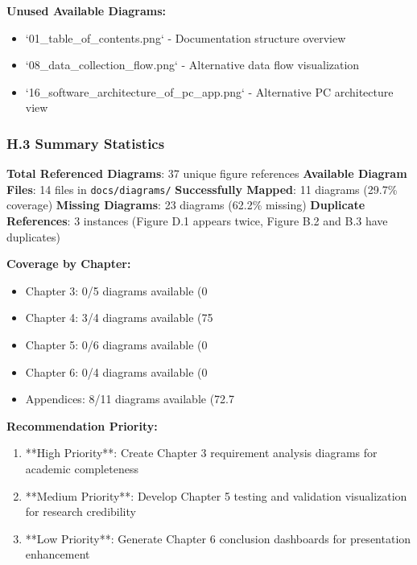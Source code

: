 \documentclass[11pt,a4paper]{article}
\begin{document}
{{\begin{itemize}
\end{itemize}
\textbf{Unused Available Diagrams:}

\begin{itemize}
\item `01_table_of_contents.png` - Documentation structure overview
\item `08_data_collection_flow.png` - Alternative data flow visualization
\item `16_software_architecture_of_pc_app.png` - Alternative PC architecture view

\end{itemize}
\subsubsection{H.3 Summary Statistics}

\textbf{Total Referenced Diagrams}: 37 unique figure references
\textbf{Available Diagram Files}: 14 files in \texttt{docs/diagrams/}
\textbf{Successfully Mapped}: 11 diagrams (29.7\% coverage)
\textbf{Missing Diagrams}: 23 diagrams (62.2\% missing)
\textbf{Duplicate References}: 3 instances (Figure D.1 appears twice, Figure B.2 and B.3 have duplicates)

\textbf{Coverage by Chapter:}

\begin{itemize}
\item Chapter 3: 0/5 diagrams available (0%
\item Chapter 4: 3/4 diagrams available (75%
\item Chapter 5: 0/6 diagrams available (0%
\item Chapter 6: 0/4 diagrams available (0%
\item Appendices: 8/11 diagrams available (72.7%

\end{itemize}
\textbf{Recommendation Priority:}

\begin{enumerate}
\item **High Priority**: Create Chapter 3 requirement analysis diagrams for academic completeness
\item **Medium Priority**: Develop Chapter 5 testing and validation visualization for research credibility
\item **Low Priority**: Generate Chapter 6 conclusion dashboards for presentation enhancement

\end{enumerate}
}}
\end{document}
